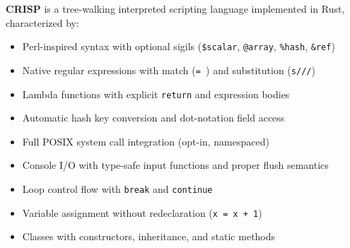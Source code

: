 \begin{tcolorbox}[colback=lightlavender, colframe=softvioletdark, title=\textbf{\textcolor{darkpurple}{Definition: CRISP}}, fonttitle=\bfseries, sharp corners]
\textbf{CRISP} is a tree-walking interpreted scripting language implemented in Rust, characterized by:
\begin{itemize}
    \item Perl-inspired syntax with optional sigils (\texttt{\$scalar}, \texttt{@array}, \texttt{\%hash}, \texttt{\&ref})
    \item Native regular expressions with match (\texttt{=~}) and substitution (\texttt{s///})
    \item Lambda functions with explicit \texttt{return} and expression bodies
    \item Automatic hash key conversion and dot-notation field access
    \item Full POSIX system call integration (opt-in, namespaced)
    \item Console I/O with type-safe input functions and proper flush semantics
    \item Loop control flow with \texttt{break} and \texttt{continue}
    \item Variable assignment without redeclaration (\texttt{x = x + 1})
    \item Classes with constructors, inheritance, and static methods
\end{itemize}
\end{tcolorbox}

